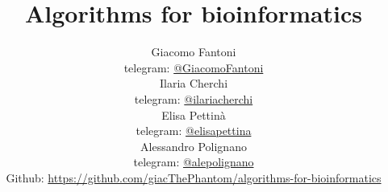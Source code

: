 

\title{\Huge\textbf{{Algorithms for bioinformatics}}}

\author{
  Giacomo Fantoni \\
  \small telegram: \href{https://t.me/GiacomoFantoni}{@GiacomoFantoni} \\[3pt]
  Ilaria Cherchi \\
  \small telegram: \href{https://t.me/ilariacherchi}{@ilariacherchi} \\[3pt]
  Elisa Pettin\`a \\
  \small telegram: \href{https://t.me/elisapettina}{@elisapettina} \\[3pt]
  Alessandro Polignano \\
  \small telegram: \href{https://t.me/alepolignano}{@alepolignano} \\[3pt]
\small Github: \href{https://github.com/giacThePhantom/algorithms-for-bioinformatics}{https://github.com/giacThePhantom/algorithms-for-bioinformatics}
}



  \maketitle
  \tableofcontents

  
  
  
  
  
  
  
  
  
  
  
  
  


